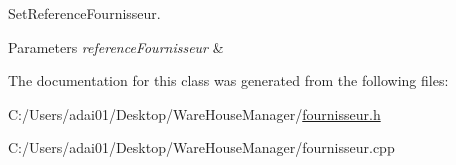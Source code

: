Set\+Reference\+Fournisseur. 


\begin{DoxyParams}{Parameters}
{\em reference\+Fournisseur} & \\
\hline
\end{DoxyParams}


The documentation for this class was generated from the following files\+:\begin{DoxyCompactItemize}
\item 
C\+:/\+Users/adai01/\+Desktop/\+Ware\+House\+Manager/\mbox{\hyperlink{fournisseur_8h}{fournisseur.\+h}}\item 
C\+:/\+Users/adai01/\+Desktop/\+Ware\+House\+Manager/fournisseur.\+cpp\end{DoxyCompactItemize}
